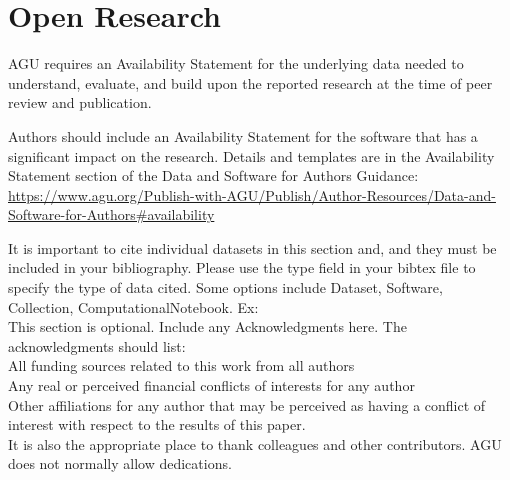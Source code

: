 \documentclass[draft]{agujournal2019}
\begin{document}
\section{Open Research}
AGU requires an Availability Statement for the underlying data needed to understand, evaluate, and build upon the reported research at the time of peer review and publication.

Authors should include an Availability Statement for the software that has a significant impact on the research. Details and templates are in the Availability Statement section of the Data and Software for Authors Guidance: \url{https://www.agu.org/Publish-with-AGU/Publish/Author-Resources/Data-and-Software-for-Authors#availability}

It is important to cite individual datasets in this section and, and they must be included in your bibliography. Please use the type field in your bibtex file to specify the type of data cited. Some options include Dataset, Software, Collection, ComputationalNotebook. Ex: 
\\


\acknowledgments
This section is optional. Include any Acknowledgments here.
The acknowledgments should list:\\
All funding sources related to this work from all authors\\
Any real or perceived financial conflicts of interests for any author\\
Other affiliations for any author that may be perceived as having a conflict of interest with respect to the results of this paper.\\
It is also the appropriate place to thank colleagues and other contributors. AGU does not normally allow dedications.



%
%

\end{document}

